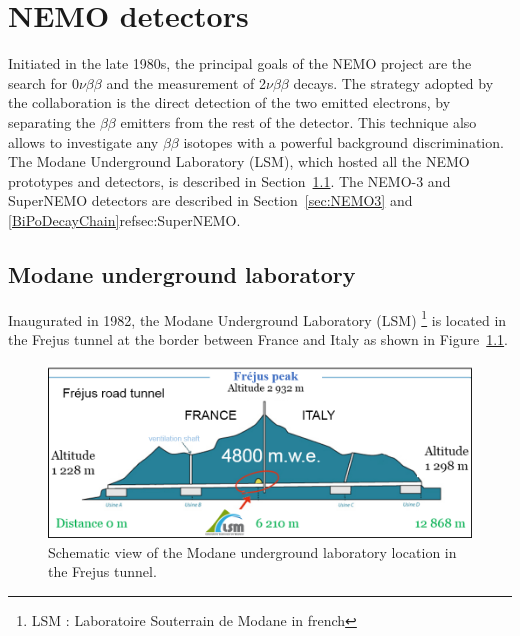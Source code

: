 \documentclass[main.tex]{subfiles}
\begin{document}
\chapter{NEMO detectors}




\NI Initiated in the late 1980s, the principal goals of the NEMO project are the search for 0$\nu\beta\beta$ and the measurement of 2$\nu\beta\beta$ decays. The strategy adopted by the collaboration is the direct detection of the two emitted electrons, by separating the $\beta\beta$ emitters from the rest of the detector. This technique also allows to investigate any $\beta\beta$ isotopes with a powerful background discrimination. The Modane Underground Laboratory (LSM), which hosted all the NEMO prototypes and detectors, is described in Section~\ref{sec:LSM}. The NEMO-3 and SuperNEMO detectors are described in Section~\ref{sec:NEMO3} and \ref{BiPoDecayChain}ref{sec:SuperNEMO}.


\section{Modane underground laboratory}\label{sec:LSM}


\NI Inaugurated in 1982, the Modane Underground Laboratory (LSM) \footnote{LSM : Laboratoire Souterrain de Modane in french} is located in the Frejus tunnel at the border between France and Italy as shown in Figure~\ref{LSMtunnel}.


\begin{figure}[h!]
\begin{center}
\includegraphics[scale=0.3]{pictures/Chap3/LSMtunnel.png}
\caption{Schematic view of the Modane underground laboratory location in the Frejus tunnel.}
\label{LSMtunnel}
\end{center}
\end{figure}
\end{document}
